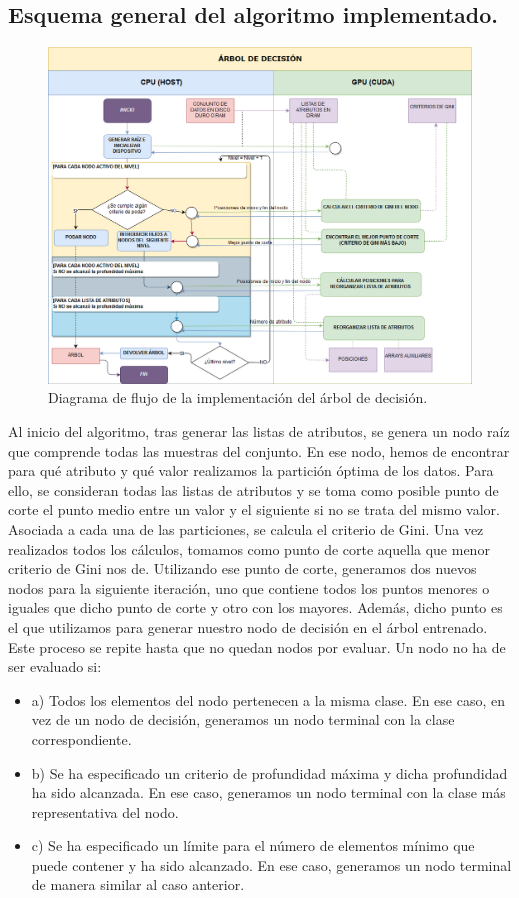 \subsection{Esquema general del algoritmo implementado.}
\begin{figure}[ht]
\centering
\includegraphics[scale=0.35]{imagenes/esquemadtree.png}
\caption{Diagrama de flujo de la implementación del árbol de decisión.}
\label{img:dtree}
\end{figure}
Al inicio del algoritmo, tras generar las listas de atributos, se genera un nodo raíz que comprende todas las muestras del conjunto. En ese nodo, hemos de encontrar para qué atributo y qué valor realizamos la partición óptima de los datos. Para ello, se consideran todas las listas de atributos y se toma como posible punto de corte el punto medio entre un valor y el siguiente si no se trata del mismo valor. Asociada a cada una de las particiones, se calcula el criterio de Gini. Una vez realizados todos los cálculos, tomamos como punto de corte aquella que menor criterio de Gini nos de. Utilizando ese punto de corte, generamos dos nuevos nodos para la siguiente iteración, uno que contiene todos los puntos menores o iguales que dicho punto de corte y otro con los mayores. Además, dicho punto es el que utilizamos para generar nuestro nodo de decisión en el árbol entrenado.  Este proceso se repite hasta que no quedan nodos por evaluar. Un nodo no ha de ser evaluado si:\\

\begin{itemize}
	\item a) Todos los elementos del nodo pertenecen a la misma clase. En ese caso, en vez de un nodo de decisión, generamos un nodo terminal con la clase correspondiente.
	\item b) Se ha especificado un criterio de profundidad máxima y dicha profundidad ha sido alcanzada. En ese caso, generamos un nodo terminal con la clase más representativa del nodo.
	\item c) Se ha especificado un límite para el número de elementos mínimo que puede contener y ha sido alcanzado. En ese caso, generamos un nodo terminal de manera similar al caso anterior.
\end{itemize}



